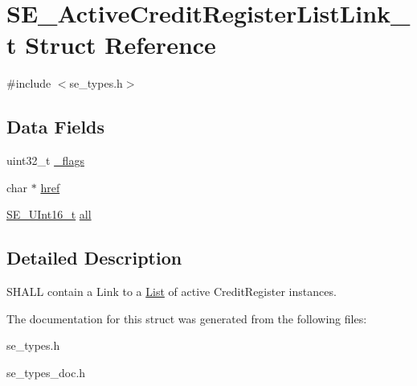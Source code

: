 \hypertarget{structSE__ActiveCreditRegisterListLink__t}{}\section{S\+E\+\_\+\+Active\+Credit\+Register\+List\+Link\+\_\+t Struct Reference}
\label{structSE__ActiveCreditRegisterListLink__t}


{\ttfamily \#include $<$se\+\_\+types.\+h$>$}

\subsection*{Data Fields}
\begin{DoxyCompactItemize}
\item 
uint32\+\_\+t \hyperlink{group__ActiveCreditRegisterListLink_gaaf0b3c3b84c47e758967e5856f621999}{\+\_\+flags}
\item 
char $\ast$ \hyperlink{group__ActiveCreditRegisterListLink_gac685dc27ee8c52ebd780e40cf6d2590c}{href}
\item 
\hyperlink{group__UInt16_gac68d541f189538bfd30cfaa712d20d29}{S\+E\+\_\+\+U\+Int16\+\_\+t} \hyperlink{group__ActiveCreditRegisterListLink_gaa7913b5cc1a4b61f153a9ee0ab97828c}{all}
\end{DoxyCompactItemize}


\subsection{Detailed Description}
S\+H\+A\+LL contain a Link to a \hyperlink{structList}{List} of active Credit\+Register instances. 

The documentation for this struct was generated from the following files\+:\begin{DoxyCompactItemize}
\item 
se\+\_\+types.\+h\item 
se\+\_\+types\+\_\+doc.\+h\end{DoxyCompactItemize}
